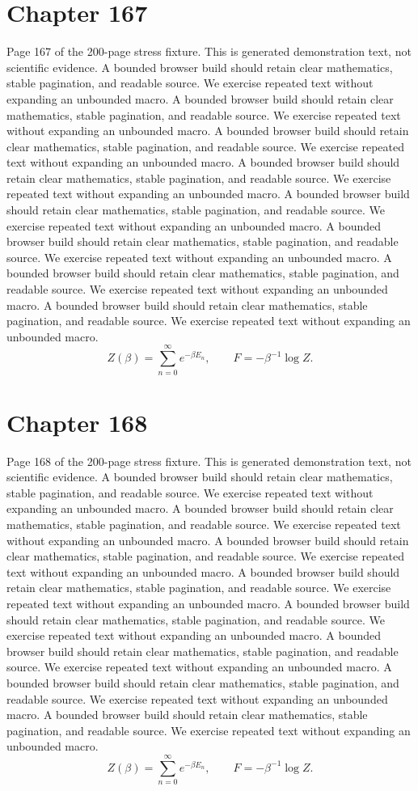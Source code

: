 \documentclass[11pt]{article}
\begin{document}
\section*{Chapter 167}
Page 167 of the 200-page stress fixture. This is generated demonstration text, not scientific evidence.
A bounded browser build should retain clear mathematics, stable pagination, and readable source. We exercise repeated text without expanding an unbounded macro.
A bounded browser build should retain clear mathematics, stable pagination, and readable source. We exercise repeated text without expanding an unbounded macro.
A bounded browser build should retain clear mathematics, stable pagination, and readable source. We exercise repeated text without expanding an unbounded macro.
A bounded browser build should retain clear mathematics, stable pagination, and readable source. We exercise repeated text without expanding an unbounded macro.
A bounded browser build should retain clear mathematics, stable pagination, and readable source. We exercise repeated text without expanding an unbounded macro.
A bounded browser build should retain clear mathematics, stable pagination, and readable source. We exercise repeated text without expanding an unbounded macro.
A bounded browser build should retain clear mathematics, stable pagination, and readable source. We exercise repeated text without expanding an unbounded macro.
A bounded browser build should retain clear mathematics, stable pagination, and readable source. We exercise repeated text without expanding an unbounded macro.
\[Z(\beta)=\sum_{n=0}^{\infty}e^{-\beta E_n},\qquad F=-\beta^{-1}\log Z.\]
\newpage
\section*{Chapter 168}
Page 168 of the 200-page stress fixture. This is generated demonstration text, not scientific evidence.
A bounded browser build should retain clear mathematics, stable pagination, and readable source. We exercise repeated text without expanding an unbounded macro.
A bounded browser build should retain clear mathematics, stable pagination, and readable source. We exercise repeated text without expanding an unbounded macro.
A bounded browser build should retain clear mathematics, stable pagination, and readable source. We exercise repeated text without expanding an unbounded macro.
A bounded browser build should retain clear mathematics, stable pagination, and readable source. We exercise repeated text without expanding an unbounded macro.
A bounded browser build should retain clear mathematics, stable pagination, and readable source. We exercise repeated text without expanding an unbounded macro.
A bounded browser build should retain clear mathematics, stable pagination, and readable source. We exercise repeated text without expanding an unbounded macro.
A bounded browser build should retain clear mathematics, stable pagination, and readable source. We exercise repeated text without expanding an unbounded macro.
A bounded browser build should retain clear mathematics, stable pagination, and readable source. We exercise repeated text without expanding an unbounded macro.
\[Z(\beta)=\sum_{n=0}^{\infty}e^{-\beta E_n},\qquad F=-\beta^{-1}\log Z.\]
\newpage
\end{document}
